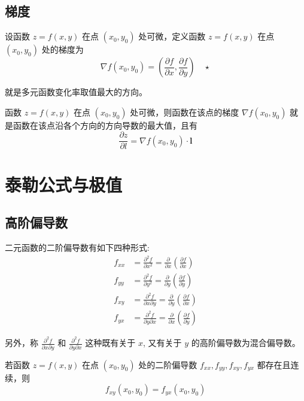 \subsection{梯度}

\begin{definition}
    设函数 $z=f(x,y)$ 在点 $(x_0,y_0)$ 处可微，定义函数 $z=f(x,y)$ 在点 $(x_0,y_0)$ 处的梯度为
    \[
        \nabla f(x_0,y_0)=\left(\frac{\partial f}{\partial x},\frac{\partial f}{\partial y}\right)\quad\star
    \]
\end{definition}

就是多元函数变化率取值最大的方向。

\begin{theorem}
    函数 $z=f(x,y)$ 在点 $(x_0,y_0)$ 处可微，则函数在该点的梯度 $\nabla f(x_0,y_0)$ 就是函数在该点沿各个方向的方向导数的最大值，且有
    \[
        \frac{\partial z}{\partial l}=\nabla f(x_0,y_0)\cdot\bm{l}
    \]
\end{theorem}

\section{泰勒公式与极值}

\subsection{高阶偏导数}

二元函数的二阶偏导数有如下四种形式:
\[
    \begin{aligned}
        f_{xx} & =\frac{\partial^2 f}{\partial x^2}=\frac{\partial}{\partial x}\left(\frac{\partial f}{\partial x}\right)         \\
        f_{yy} & =\frac{\partial^2 f}{\partial y^2}=\frac{\partial}{\partial y}\left(\frac{\partial f}{\partial y}\right)         \\
        f_{xy} & =\frac{\partial^2 f}{\partial x\partial y}=\frac{\partial}{\partial y}\left(\frac{\partial f}{\partial x}\right) \\
        f_{yx} & =\frac{\partial^2 f}{\partial y\partial x}=\frac{\partial}{\partial x}\left(\frac{\partial f}{\partial y}\right)
    \end{aligned}
\]

另外，称 $\frac{\partial^2 f}{\partial x\partial y}$ 和 $\frac{\partial^2 f}{\partial y\partial x}$ 这种既有关于 $x$, 又有关于 $y$ 的高阶偏导数为混合偏导数。
\begin{theorem}
    若函数 $z=f(x,y)$ 在点 $(x_0,y_0)$ 处的二阶偏导数 $f_{xx},f_{yy},f_{xy},f_{yx}$ 都存在且连续，则
    \[
        f_{xy}(x_0,y_0)=f_{yx}(x_0,y_0)
    \]
\end{theorem}

